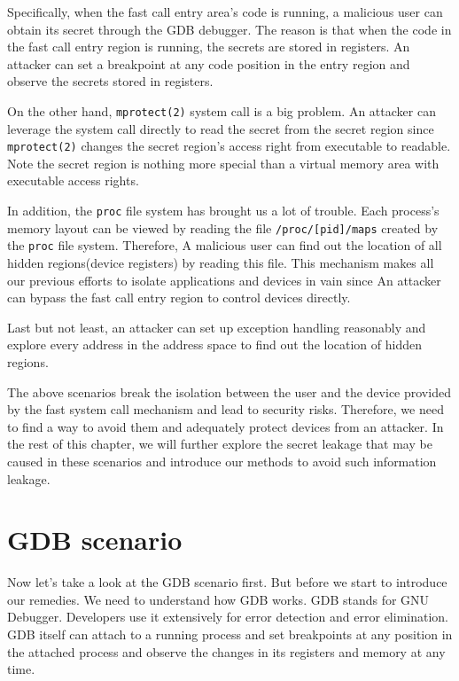 Specifically, when the fast call entry area's code is running, a malicious 
user can obtain its secret through the GDB debugger. The reason is that when 
the code in the fast call entry region is running, the secrets are stored in 
registers. An attacker can set a breakpoint at any code position in the entry
 region and observe the secrets stored in registers.

On the other hand, \verb|mprotect(2)| system call is a big problem. An attacker 
can leverage the system call directly to read the secret from the secret 
region since \verb|mprotect(2)| changes the secret region's access right from 
executable to readable.  Note the secret region is nothing more special 
than a virtual memory area with executable access rights. 

In addition, the \verb|proc| file system has brought us a lot of trouble. 
Each process's memory layout can be viewed by reading the file \verb|/proc/[pid]/maps| 
created by the \verb|proc| file system. Therefore,  A malicious user can find out the 
location of all hidden regions(device registers) by reading this file. This 
mechanism makes all our previous efforts to isolate applications and devices 
in vain since An attacker can bypass the fast call entry region to control 
devices directly.  

Last but not least, an attacker can set up exception handling reasonably and 
explore every address in the address space to find out the location of hidden 
regions. 

The above scenarios break the isolation between the user and the device 
provided by the fast system call mechanism and lead to security risks. 
Therefore, we need to find a way to avoid them and adequately protect 
devices from an attacker. In the rest of this chapter, we will further 
explore the secret leakage that may be caused in these scenarios and 
introduce our methods to avoid such information leakage.

\section{GDB scenario}
Now let's take a look at the GDB scenario first. 
But before we start to introduce our remedies. We need to understand 
how GDB works. GDB stands for GNU Debugger. Developers use it extensively for error 
detection and error elimination. GDB itself can attach to a running 
process and set breakpoints at any position in the attached process 
and observe the changes in its registers and memory at any time. 



